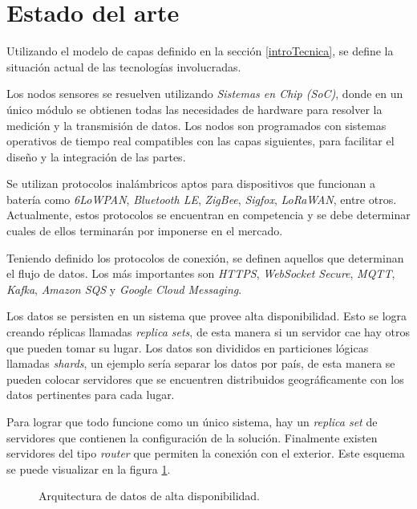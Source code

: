 \section{Estado del arte}
\label{estadoArte}

	Utilizando el modelo de capas definido en la sección \ref{introTecnica}, se define la situación actual de las tecnologías involucradas.
	
		Los nodos sensores se resuelven utilizando \emph{Sistemas en Chip (SoC)}, donde en un único módulo se obtienen todas las necesidades de hardware para resolver la medición y la transmisión de datos. Los nodos son programados con sistemas operativos de tiempo real compatibles con las capas siguientes, para facilitar el diseño y la integración de las partes.
	
	Se utilizan protocolos inalámbricos aptos para dispositivos que funcionan a batería como \emph{6LoWPAN}, \emph{Bluetooth LE}, \emph{ZigBee}, \emph{Sigfox}, \emph{LoRaWAN}, entre otros. Actualmente, estos protocolos se encuentran en competencia y se debe determinar cuales de ellos terminarán por imponerse en el mercado.
		
		Teniendo definido los protocolos de conexión, se definen aquellos que determinan el flujo de datos. Los más importantes son \emph{HTTPS}, \emph{WebSocket Secure}, \emph{MQTT}, \emph{Kafka}, \emph{Amazon SQS} y \emph{Google Cloud Messaging}.
	
		Los datos se persisten en un sistema que provee alta disponibilidad. Esto se logra creando réplicas llamadas \emph{replica sets}, de esta manera si un servidor cae hay otros que pueden tomar su lugar. Los datos son divididos en particiones lógicas llamadas \emph{shards}, un ejemplo sería separar los datos por país, de esta manera se pueden colocar servidores que se encuentren distribuidos geográficamente con los datos pertinentes para cada lugar.
		
		Para lograr que todo funcione como un único sistema, hay un \emph{replica set} de servidores que contienen la configuración de la solución. Finalmente existen servidores del tipo \emph{router} que permiten la conexión con el exterior. Este esquema se puede visualizar en la figura \ref{fig:mongodb}.
	
		\begin{figure}[h]
			\centering
			\caption{Arquitectura de datos de alta disponibilidad.}
			\label{fig:mongodb}
		\end{figure}
	

